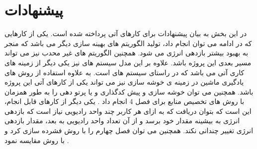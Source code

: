 \section{پیشنهادات}
در این بخش به بیان پیشنهادات برای کارهای آتی پرداخته شده است. یکی از کارهایی که در ادامه می توان انجام داد، تولید الگوریتم های بهینه سازی دیگر می باشد که منجر به بهبود بیشتر بازدهی انرژی می شود. همچنین الگوریتم های غیر محدب نیز می تواند مسیر بعدی این پروژه باشد. علاوه بر این مدل سیستم های  نیز یکی دیگر از زمینه های کاری آتی می باشد که در راستای سیستم های  است. به علاوه استفاده از روش های یادگیری ماشین در زمینه ی خوشه سازی نیز می تواند یکی از کارهای  آتی این پروژه باشد. همچنین می توان خوشه سازی و پیش کدگذاری و یا پرتو دهی را به طور همزمان با روش های تخصیص منابع برای فصل 4 انجام داد \cite{clusterbeam}. یکی دیگر از کارهای قابل انجام، این است که بتوان دریافت که به ازای هر کاربر چند واحد رادیویی نیاز است که بازدهی انرژی به بیشینه مقدار خود برسد و از آن تعداد واحد رادیویی به بعد، مقدار بازدهی انرژی تغییر چندانی نکند. همچنین می توان فصل چهارم را با روش   فشرده سازی کرد و با روش   مقایسه نمود \cite{ulSimeone}. 